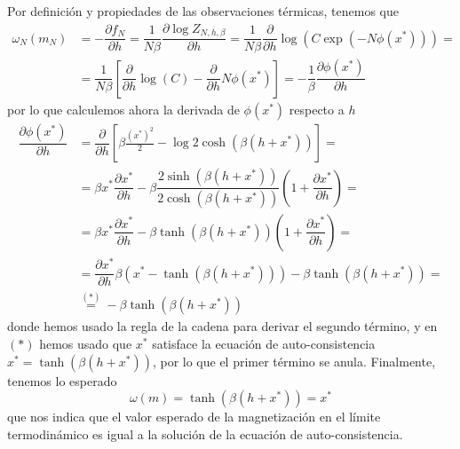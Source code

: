 \noindent
Por definición y propiedades de las observaciones térmicas, tenemos que
\begin{align*}
    \omega_N(m_N) &= -\dfrac{\partial f_N}{\partial h} = \dfrac{1}{N\beta} \dfrac{\partial \log Z_{N,h,\beta}}{\partial h}= \dfrac{1}{N\beta} \dfrac{\partial}{\partial h}\log \left(C \exp(-N\phi(x^*))\right) =\\
    &= \dfrac{1}{N\beta} \left[\dfrac{\partial }{\partial h} \log(C)- \dfrac{\partial}{\partial h} N\phi(x^*)\right]=-\dfrac{1}{\beta} \dfrac{\partial \phi(x^*)}{\partial h}
\end{align*}
por lo que calculemos ahora la derivada de $\phi(x^*)$ respecto a $h$
\begin{align*}
    \dfrac{\partial \phi(x^*)}{\partial h} &= \dfrac{\partial }{\partial h} \left[ \beta \frac{(x^*)^2}{2} - \log 2 \cosh(\beta(h + x^*)) \right] = \\
    &= \beta x^* \dfrac{\partial x^*}{\partial h} - \beta \dfrac{2\sinh(\beta(h+x^*))}{2\cosh(\beta(h+x^*))} \left(1 + \dfrac{\partial x^*}{\partial h} \right) = \\
    &= \beta x^* \dfrac{\partial x^*}{\partial h} - \beta \tanh(\beta(h+x^*)) \left(1 + \dfrac{\partial x^*}{\partial h} \right)=\\
    &=\dfrac{\partial x^*}{\partial h} \beta \left( x^* - \tanh(\beta(h+x^*)) \right) - \beta \tanh(\beta(h+x^*))=\\
    &\overset{(*)}{=}- \beta \tanh(\beta(h+x^*))
\end{align*}
donde hemos usado la regla de la cadena para derivar el segundo término, y en $(*)$ hemos usado que $x^*$ satisface la ecuación de auto-consistencia $x^* = \tanh(\beta(h+x^*))$, por lo que el primer término se anula. Finalmente, tenemos lo esperado
\begin{equation*}
    \omega(m)=\tanh(\beta(h+x^*))=x^*
\end{equation*}
que nos indica que el valor esperado de la magnetización en el límite termodinámico es igual a la solución de la ecuación de auto-consistencia. \\

